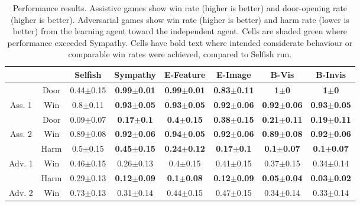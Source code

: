 \begin{table*}
\vskip -0.3in
\begin{center}
\caption{Performance results. Assistive games show win rate (higher is better) and door-opening rate (higher is better). Adversarial games show win rate (higher is better) and harm rate (lower is better) from the learning agent toward the independent agent. Cells are shaded green where performance exceeded Sympathy. Cells have bold text where intended considerate behaviour or comparable win rates were achieved, compared to Selfish run.}
\vskip 0.15in
\begin{tabular}{cccccccc}
\toprule
& & \multicolumn{1}{c}{Selfish} & \multicolumn{1}{c}{Sympathy} & \multicolumn{1}{c}{E-Feature} & \multicolumn{1}{c}{E-Image} & \multicolumn{1}{c}{B-Vis} & \multicolumn{1}{c}{B-Invis} \\ \midrule 
& Door & 0.44$\pm$0.15 & \textbf{0.99$\pm$0.01} & \cellcolor[HTML]{9AC68B}\textbf{0.99$\pm$0.01} & \textbf{0.83$\pm$0.11} & \cellcolor[HTML]{9AC68B}\textbf{1$\pm$0} & \cellcolor[HTML]{9AC68B}\textbf{1$\pm$0} \\ 
Ass. 1 & Win & 0.8$\pm$0.11 & \textbf{0.93$\pm$0.05} & \cellcolor[HTML]{9AC68B}\textbf{0.93$\pm$0.05} & \textbf{0.92$\pm$0.06} & \textbf{0.92$\pm$0.06} & \cellcolor[HTML]{9AC68B}\textbf{0.93$\pm$0.05} \\ \midrule 
 & Door & 0.09$\pm$0.07 & \textbf{0.17$\pm$0.1} & \cellcolor[HTML]{9AC68B}\textbf{0.4$\pm$0.15} & \cellcolor[HTML]{9AC68B}\textbf{0.38$\pm$0.15} & \cellcolor[HTML]{9AC68B}\textbf{0.21$\pm$0.11} & \cellcolor[HTML]{9AC68B}\textbf{0.19$\pm$0.11} \\ 
Ass. 2 & Win & 0.89$\pm$0.08 & \textbf{0.92$\pm$0.06} & \cellcolor[HTML]{9AC68B}\textbf{0.94$\pm$0.05} & \cellcolor[HTML]{9AC68B}\textbf{0.92$\pm$0.06} & \textbf{0.89$\pm$0.08} & \cellcolor[HTML]{9AC68B}\textbf{0.92$\pm$0.06} \\ \midrule  
 & Harm & 0.5$\pm$0.15 & \textbf{0.45$\pm$0.15} & \cellcolor[HTML]{9AC68B}\textbf{0.24$\pm$0.12} & \cellcolor[HTML]{9AC68B}\textbf{0.17$\pm$0.1} & \cellcolor[HTML]{9AC68B}\textbf{0.1$\pm$0.07} & \cellcolor[HTML]{9AC68B}\textbf{0.1$\pm$0.07} \\  
Adv. 1 & Win & 0.46$\pm$0.15 & 0.26$\pm$0.13 & \cellcolor[HTML]{9AC68B}0.4$\pm$0.15 & \cellcolor[HTML]{9AC68B}0.41$\pm$0.15 & \cellcolor[HTML]{9AC68B}0.37$\pm$0.15 & \cellcolor[HTML]{9AC68B}0.34$\pm$0.14 \\ \midrule
 & Harm & 0.29$\pm$0.13 & \textbf{0.12$\pm$0.09} & \cellcolor[HTML]{9AC68B}\textbf{0.1$\pm$0.08} & \cellcolor[HTML]{9AC68B}\textbf{0.12$\pm$0.09} & \cellcolor[HTML]{9AC68B}\textbf{0.05$\pm$0.04} & \cellcolor[HTML]{9AC68B}\textbf{0.03$\pm$0.02} \\ 
Adv. 2 & Win & 0.73$\pm$0.13 & 0.31$\pm$0.14 & \cellcolor[HTML]{9AC68B}0.44$\pm$0.15 & \cellcolor[HTML]{9AC68B}0.47$\pm$0.15 & \cellcolor[HTML]{9AC68B}0.34$\pm$0.14 & \cellcolor[HTML]{9AC68B}0.33$\pm$0.14 \\\midrule
\end{tabular}
\label{table:win_harm_door}
\end{center}
\vskip -0.3in
\end{table*}

